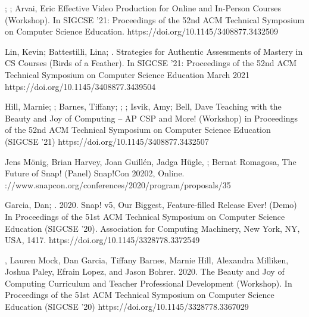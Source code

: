 \begin{etaremune}
    \item{\me; \dan; Arvai, Eric
    \newline Effective Video Production for Online and In-Person Courses (Workshop).
    \newline In SIGCSE '21: Proceedings of the 52nd ACM Technical Symposium on Computer Science Education.
    \newline
    https://doi.org/10.1145/3408877.3432509}
    
    \item{Lin, Kevin; Battestilli, Lina; \me. Strategies for Authentic Assessments of Mastery in CS Courses (Birds of a Feather). \newline In SIGCSE '21: Proceedings of the 52nd ACM Technical Symposium on Computer Science Education March 2021
    \newline
    https://doi.org/10.1145/3408877.3439504}
    
    \item{Hill, Marnie; \dan; Barnes, Tiffany; \lauren; \me; Isvik, Amy; Bell, Dave
    \newline Teaching with the Beauty and Joy of Computing – AP CSP and More! (Workshop)
    \newline in Proceedings of the 52nd ACM Technical Symposium on Computer Science Education (SIGCSE '21)
    \newline
    https://doi.org/10.1145/3408877.3432507}
    
    \item{Jens Mönig, Brian Harvey, Joan Guillén, Jadga Hügle, \me; Bernat Romagosa, The Future of Snap! (Panel) Snap!Con 20202, Online.
    \newlinehttps://www.snapcon.org/conferences/2020/program/proposals/35
    }
    
    \item{Garcia, Dan; \me. 2020. Snap! v5, Our Biggest, Feature-filled Release Ever! (Demo) In Proceedings of the 51st ACM Technical Symposium on Computer Science Education (SIGCSE '20). Association for Computing Machinery, New York, NY, USA, 1417. https://doi.org/10.1145/3328778.3372549}
    
    \item{\me, Lauren Mock, Dan Garcia, Tiffany Barnes, Marnie Hill, Alexandra Milliken, Joshua Paley, Efrain Lopez, and Jason Bohrer. 2020. The Beauty and Joy of Computing Curriculum and Teacher Professional Development (Workshop). In Proceedings of the 51st ACM Technical Symposium on Computer Science Education (SIGCSE '20)
    \newline
    https://doi.org/10.1145/3328778.3367029}
    

\end{etaremune}
